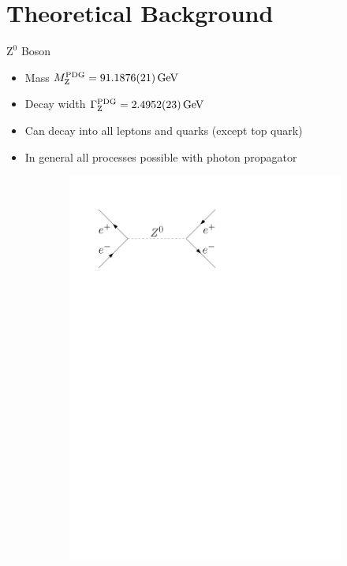 \documentclass[11pt,xcolor=dvipsnames,professionalfonts]{beamer}
\begin{document}
\section{Theoretical Background}
\begin{frame}{$\mathrm{Z}^0$ Boson}
	\begin{itemize}
		\item Mass $M_\mathrm{Z}^\mathrm{PDG} = \SI{91.1876 +- 0.0021}{GeV}$
		\item Decay width $\Gamma_\mathrm{Z}^\mathrm{PDG} = \SI{2.4952 +- 0.0023}{GeV}$
		\item Can decay into all leptons and quarks (except top quark)
		\item In general all processes possible with photon propagator
	\end{itemize}
	\begin{figure}[htb]
		\centering
		\begin{subfigure}{.28\textwidth}
			\centering
			\includegraphics[width=.8\textwidth]{./figures/theory/feynman/ee_s}
		\end{subfigure}
		\begin{subfigure}{.28\textwidth}

\end{subfigure}
\end{figure}
\end{frame}
\end{document}
